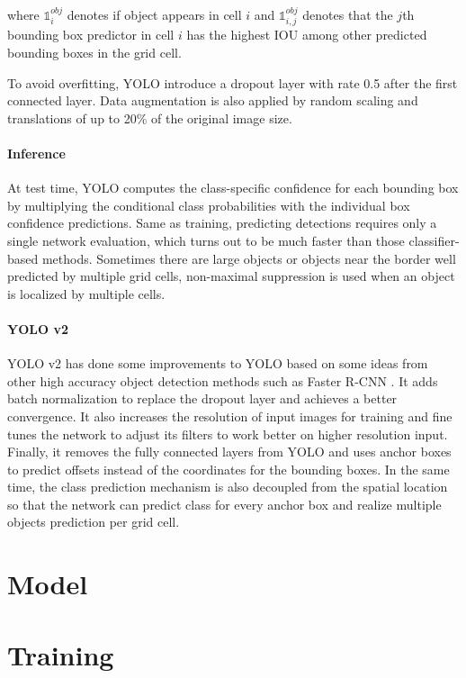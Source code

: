 where $ \mathbb{1}_{i}^{obj} $ denotes if object appears in cell $ i $ and $ \mathbb{1}_{i,j}^{obj} $ denotes that the $j$th bounding box predictor in cell $ i $ has the highest IOU among other predicted bounding boxes in the grid cell.

To avoid overfitting, YOLO introduce a dropout layer with rate 0.5 after the first connected layer. Data augmentation is also applied by random scaling and translations of up to 20\% of the original image size.

\paragraph{Inference}

At test time, YOLO computes the class-specific confidence for each bounding box by multiplying the conditional class probabilities with the individual box confidence predictions. Same as training, predicting detections requires only a single network evaluation, which turns out to be much faster than those classifier-based methods. Sometimes there are large objects or objects near the border well predicted by multiple grid cells, non-maximal suppression is used when an object is localized by multiple cells.

\paragraph{YOLO v2}
YOLO v2 has done some improvements to YOLO based on some ideas from other high accuracy object detection methods such as Faster R-CNN \cite{}. It adds batch normalization to replace the dropout layer and achieves a better convergence. It also increases the resolution of input images for training and fine tunes the network to adjust its filters to work better on higher resolution input. Finally, it removes the fully connected layers from YOLO and uses anchor boxes to predict offsets instead of the coordinates for the bounding boxes. In the same time, the class prediction mechanism is also decoupled from the spatial location so that the network can predict class for every anchor box and realize multiple objects prediction per grid cell.


\section{Model}
\section{Training}
